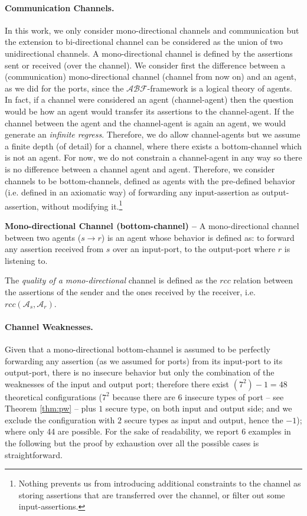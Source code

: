 \documentclass[runningheads]{llncs}
\newcommand{\assertionRegion}{\mathcal{A}}
\newcommand{\beliefRegion}{\mathcal{B}}
\newcommand{\factRegion}{\mathcal{F}}
\newcommand{\rcc}{rcc}
\newcommand{\abftheory}{\assertionRegion\beliefRegion\factRegion}
\newcommand{\Rcc}[2]{rcc(#1,#2)}
\begin{document}
\paragraph{Communication Channels.}
In this work, we only consider
mono-directional channels and communication but the extension to bi-directional
channel can be considered as the union of two unidirectional channels. A
mono-directional channel is defined by the assertions sent or received (over
the channel). 
We consider first the difference between a (communication)
mono-directional channel (channel from now on) and an agent, as we did for the
ports, since the $\abftheory$-framework is a logical theory of agents.  In fact, if a channel
were considered an agent (channel-agent) then the question would be how an
agent would transfer its assertions to the channel-agent. If the channel
between the agent and the channel-agent is again an agent, we would generate an
\emph{infinite regress}. Therefore, we do allow channel-agents but we assume a
finite depth (of detail) for a channel, where there exists a bottom-channel
which is not an agent. For now, we do not constrain a channel-agent in any way
so there is no difference between a channel agent and agent. Therefore,
we consider channels to be bottom-channels,
defined as agents with the pre-defined behavior (i.e. defined in an axiomatic
way) of forwarding any input-assertion as output-assertion, without modifying it.\footnote{Nothing
prevents us from introducing additional constraints to the channel as storing
assertions that are transferred over the channel, or filter out some
input-assertions.}

\begin{definition}{\bf Mono-directional Channel (bottom-channel) --}\label{def:monochannel}
	A mono-directional channel between two agents ($s \rightarrow r$) is
	an agent whose behavior is defined as: to
	forward any assertion received from $s$ over an input-port, to  the
	output-port where $r$ is listening to.
\end{definition}
The \emph{quality of a mono-directional} channel is defined as the $\rcc$
relation between the assertions of the sender and the ones received by the
receiver, i.e. $\Rcc{\assertionRegion_s}{\assertionRegion_r}$.

\paragraph{Channel Weaknesses.}
Given that a mono-directional bottom-channel is assumed to be perfectly
forwarding any assertion (as we assumed for ports) from its input-port to its
output-port, there is no insecure behavior but only the combination of the
weaknesses of the input and output port; therefore there exist $(7^2)-1=48$
theoretical configurations ($7^2$ because there are $6$ insecure types of port -- see Theorem \ref{thm:pw} -- plus $1$ secure type, on both input and output side; and we exclude the
configuration with $2$ secure types as input and output, hence the $-1$); where only 44
are possible. For the sake of readability, we report 6 examples in the
following but the proof by exhaustion over all the possible cases is
straightforward.
\end{document}

